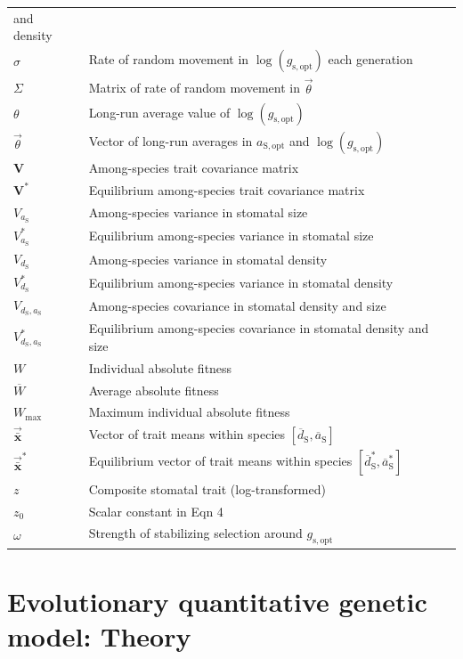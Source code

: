 \documentclass[
  letterpaper,
  DIV=11,
  numbers=noendperiod]{scrartcl}
\begin{document}
\begin{longtable}[]{@{}
  >{\raggedright\arraybackslash}p{}
  >{\raggedright\arraybackslash}p{}@{}}
and density \\
\(\sigma\) & Rate of random movement in
\(\log \left( g_\mathrm{s,opt} \right)\) each generation \\
\(\Sigma\) & Matrix of rate of random movement in \(\vec{\theta}\) \\
\(\theta\) & Long-run average value of
\(\log \left( g_\mathrm{s,opt} \right)\) \\
\(\vec{\theta}\) & Vector of long-run averages in \(a_\mathrm{S,opt}\)
and \(\log \left( g_\mathrm{s,opt} \right)\) \\
\(\mathbf{V}\) & Among-species trait covariance matrix \\
\(\mathbf{V}^*\) & Equilibrium among-species trait covariance matrix \\
\(V_{a_\mathrm{S}}\) & Among-species variance in stomatal size \\
\(V_{a_\mathrm{S}}^*\) & Equilibrium among-species variance in stomatal
size \\
\(V_{d_\mathrm{S}}\) & Among-species variance in stomatal density \\
\(V_{d_\mathrm{S}}^*\) & Equilibrium among-species variance in stomatal
density \\
\(V_{d_\mathrm{S},a_\mathrm{S}}\) & Among-species covariance in stomatal
density and size \\
\(V_{d_\mathrm{S},a_\mathrm{S}}^*\) & Equilibrium among-species
covariance in stomatal density and size \\
\(W\) & Individual absolute fitness \\
\(\overline{W}\) & Average absolute fitness \\
\(W_\mathrm{max}\) & Maximum individual absolute fitness \\
\(\vec{\bar{\mathbf{x}}}\) & Vector of trait means within species
\([\overline{d}_\mathrm{S}, \overline{a}_\mathrm{S}]\) \\
\(\vec{\bar{\mathbf{x}}}^*\) & Equilibrium vector of trait means within
species \([\overline{d}_\mathrm{S}^*, \overline{a}_\mathrm{S}^*]\) \\
\(z\) & Composite stomatal trait (log-transformed) \\
\(z_0\) & Scalar constant in Eqn 4 \\
\(\omega\) & Strength of stabilizing selection around
\(g_\mathrm{s,opt}\) \\
\end{longtable}

\section{Evolutionary quantitative genetic model:
Theory}\label{sec-theory}
\end{document}
